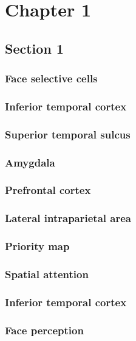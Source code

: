 \documentclass[man, 10pt, a4paper]{book}
\begin{document}
 
\chapter{Chapter 1}
 
\section{Section 1}  

\subsection{Face selective cells}\label{Face selective cells}

\subsection{Inferior temporal cortex}\label{Inferior temporal cortex}

\subsection{Superior temporal sulcus}\label{Superior temporal sulcus}

\subsection{Amygdala}\label{Amygdala}

\subsection{Prefrontal cortex}\label{Prefrontal cortex}

\subsection{Lateral intraparietal area}\label{Lateral intraparietal area}

\subsection{Priority map}\label{Priority map}

\subsection{Spatial attention}\label{Spatial attention}

\subsection{Inferior temporal cortex}\label{Inferior temporal cortex}

\subsection{Face perception}\label{Face perception}
\end{document}
